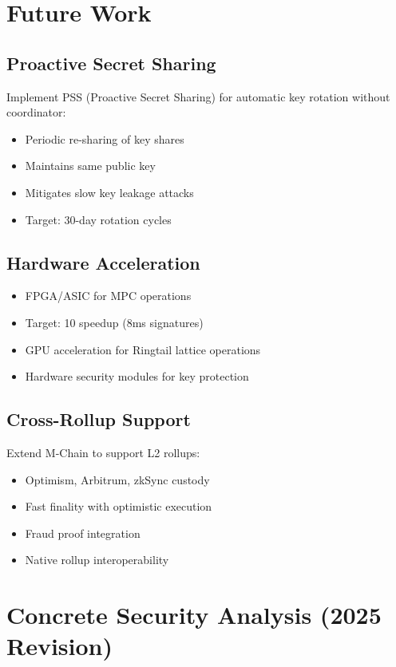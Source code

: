 \documentclass[11pt]{article}
\begin{document}
\section{Future Work}

\subsection{Proactive Secret Sharing}

Implement PSS (Proactive Secret Sharing) for automatic key rotation without coordinator:
\begin{itemize}
\item Periodic re-sharing of key shares
\item Maintains same public key
\item Mitigates slow key leakage attacks
\item Target: 30-day rotation cycles
\end{itemize}

\subsection{Hardware Acceleration}

\begin{itemize}
\item FPGA/ASIC for MPC operations
\item Target: 10\times{} speedup (8ms signatures)
\item GPU acceleration for Ringtail lattice operations
\item Hardware security modules for key protection
\end{itemize}

\subsection{Cross-Rollup Support}

Extend M-Chain to support L2 rollups:
\begin{itemize}
\item Optimism, Arbitrum, zkSync custody
\item Fast finality with optimistic execution
\item Fraud proof integration
\item Native rollup interoperability
\end{itemize}

\section{Concrete Security Analysis (2025 Revision)}
\end{document}
